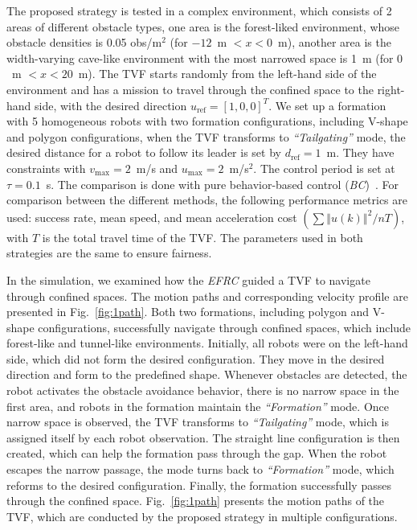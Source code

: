 The proposed strategy is tested in a complex environment, which consists of 2 areas of different obstacle types, one area is the forest-liked environment, whose obstacle densities is 0.05 obs/m$^2$ (for $-12$~m $<x<0$~m), another area is the width-varying cave-like environment with the most narrowed space is 1~m (for $0$~m $<x<20$~m). The TVF starts randomly from the left-hand side of the environment and has a mission to travel through the confined space to the right-hand side, with the desired direction $u_\text{ref}=\left[1,0,0\right]^T$. We set up a formation with 5 homogeneous robots with two formation configurations, including V-shape and polygon configurations, when the TVF transforms to \textit{``Tailgating''} mode, the desired distance for a robot to follow its leader is set by $d_\text{ref}=1$~m. They have constraints with $v_\text{max}=2$~m/s and $u_\text{max}=2$~m/s$^2$. The control period is set at $\tau=0.1$~s. The comparison is done with pure behavior-based control (\textit{BC})~\cite{736776,Vsrhelyi2018}. For comparison between the different methods, the following performance metrics are used: success rate, mean speed, and mean acceleration cost $(\sum{\left\Vert u(k)\right\Vert^2}/{nT})$, with $T$ is the total travel time of the TVF. The parameters used in both strategies are the same to ensure fairness.

In the simulation, we examined how the \textit{EFRC} guided a TVF to navigate through confined spaces. The motion paths and corresponding velocity profile are presented in Fig.~\ref{fig:1path}. Both two formations, including polygon and V-shape configurations, successfully navigate through confined spaces, which include forest-like and tunnel-like environments. Initially, all robots were on the left-hand side, which did not form the desired configuration. They move in the desired direction and form to the predefined shape. Whenever obstacles are detected, the robot activates the obstacle avoidance behavior, there is no narrow space in the first area, and robots in the formation maintain the \textit{``Formation''} mode. Once narrow space is observed, the TVF transforms to \textit{``Tailgating''} mode, which is assigned itself by each robot observation. The straight line configuration is then created, which can help the formation pass through the gap. When the robot escapes the narrow passage, the mode turns back to \textit{``Formation''} mode, which reforms to the desired configuration. Finally, the formation successfully passes through the confined space. Fig.~\ref{fig:1path} presents the motion paths of the TVF, which are conducted by the proposed strategy in multiple configurations.

